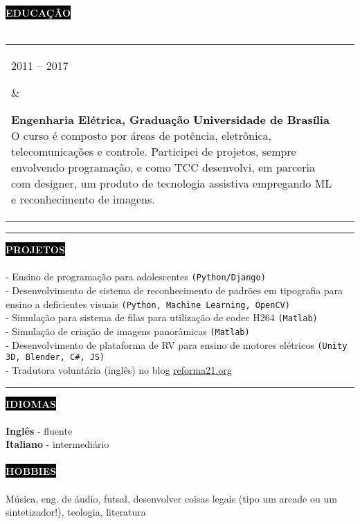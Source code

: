 \documentclass[10pt,A4]{article}
\makeatletter
\newcounter{a}
\newcounter{b}
\newcounter{c}
\newcommand{\cvsection}[1] {
	\textcolor{white}{\MakeUppercase{\textbf{#1}}}
}
\newcommand{\cvsect}[1]{
	\colorbox{black}{{\cvsection{#1}}}\\\\%
}
\newenvironment{entrylist}{%
	\begin{tabular*}{\textwidth}[t]{@{\extracolsep{\fill}}ll}
	}{%
	\end{tabular*}
}
\newcommand{\entry}[4]{%
	\parbox[t]{3.5cm}{%
		#1%
	}%
	&\parbox[t]{14cm}{%
		\textbf{#2}%
		\hfill%
		{\footnotesize \textbf{\textcolor{black}{#3}}}\\%
		#4%
	}\\\\}
\makeatother
\begin{document}
	\cvsect{Educação}
	\begin{entrylist}
		\entry
		{2011 – 2017}
		{Engenharia Elétrica, Graduação}
		{Universidade de Brasília}
		{O curso é composto por áreas de potência, eletrônica, telecomunicações e controle. Participei de projetos, sempre envolvendo programação, e como TCC desenvolvi, em parceria com designer, um produto de tecnologia assistiva empregando ML e reconhecimento de imagens.}
		\entry
		{2014 - 2015}
		{Ciência sem Fronteiras UK, Graduação Sanduíche}
		{Brunel University London}
		{O programa teve duração de 15 meses, no qual participei de curso intensivo de inglês acadêmico, projeto acadêmico de verão em processamento de vídeo (Matlab) e um ano do curso de graduação em engenharia elétrica e eletrônica, com ênfase em processamento de sinais digitais.}
	\end{entrylist}

	\begin{minipage}[t]{0.7\textwidth}\hrule height 0pt width 0pt%
		\cvsect{Projetos}
		- Ensino de programação para adolescentes \texttt{(Python/Django)}\\
		- Desenvolvimento de sistema de reconhecimento de padrões em tipografia para ensino a deficientes visuais \texttt{(Python, Machine Learning, OpenCV)}\\
		- Simulação para sistema de filas para utilização de codec H264 \texttt{(Matlab)}\\
		- Simulação de criação de imagens panorâmicas \texttt{(Matlab)}\\
		- Desenvolvimento de plataforma de RV para ensino de motores elétricos \texttt{(Unity 3D, Blender, C\#, JS)}\\
		- Tradutora voluntária (inglês) no blog {\href{https://reforma21.org/}{reforma21.org}}
	\end{minipage}%
	\hspace{1cm}
	\begin{minipage}[t]{0.27\textwidth}\hrule height 0pt width 0pt%
		\cvsect{Idiomas}
		\textbf{Inglês} - fluente\\
		\textbf{Italiano} - intermediário\\\\
		\cvsect{Hobbies}
		Música, eng. de áudio, futsal, desenvolver coisas legais (tipo um arcade ou um sintetizador!), teologia, literatura
	\end{minipage}%
\end{document}
